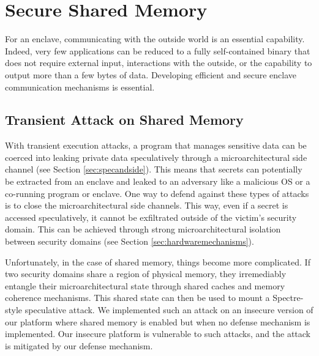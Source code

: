 \section{Secure Shared Memory}
\label{sec:sharedmemory}

For an enclave, communicating with the outside world is an essential capability.
Indeed, very few applications can be reduced to a fully self-contained binary that does not require external input, interactions with the outside, or the capability to output more than a few bytes of data.
Developing efficient and secure enclave communication mechanisms is essential.

\subsection{Transient Attack on Shared Memory}

With transient execution attacks, a program that manages sensitive data can be coerced into leaking private data speculatively through a microarchitectural side channel (see Section \ref{sec:specandside}).
This means that secrets can potentially be extracted from an enclave and leaked to an adversary like a malicious OS or a co-running program or enclave.
One way to defend against these types of attacks is to close the microarchitectural side channels.
This way, even if a secret is accessed speculatively, it cannot be exfiltrated outside of the victim's security domain.
This can be achieved through strong microarchitectural isolation between security domains (see Section \ref{sec:hardwaremechanisms}).

Unfortunately, in the case of shared memory, things become more complicated.
If two security domains share a region of physical memory, they irremediably entangle their microarchitectural state through shared caches and memory coherence mechanisms.
This shared state can then be used to mount a Spectre-style speculative attack.
We implemented such an attack on an insecure version of our platform where shared memory is enabled but when no defense mechanism is implemented.
Our insecure platform is vulnerable to such attacks, and the attack is mitigated by our defense mechanism.


